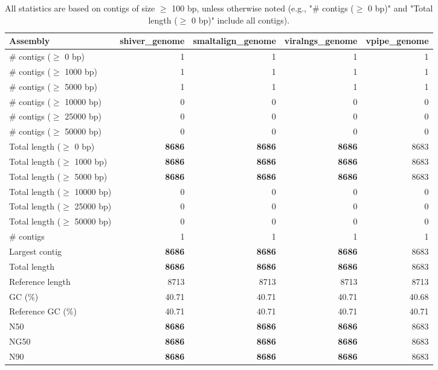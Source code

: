 \documentclass[12pt,a4paper]{article}
\begin{document}
\begin{table}[ht]
\begin{center}
\caption{All statistics are based on contigs of size $\geq$ 100 bp, unless otherwise noted (e.g., "\# contigs ($\geq$ 0 bp)" and "Total length ($\geq$ 0 bp)" include all contigs).}
\begin{tabular}{|l*{4}{|r}|}
\hline
Assembly & shiver\_genome & smaltalign\_genome & viralngs\_genome & vpipe\_genome \\ \hline
\# contigs ($\geq$ 0 bp) & 1 & 1 & 1 & 1 \\ \hline
\# contigs ($\geq$ 1000 bp) & 1 & 1 & 1 & 1 \\ \hline
\# contigs ($\geq$ 5000 bp) & 1 & 1 & 1 & 1 \\ \hline
\# contigs ($\geq$ 10000 bp) & 0 & 0 & 0 & 0 \\ \hline
\# contigs ($\geq$ 25000 bp) & 0 & 0 & 0 & 0 \\ \hline
\# contigs ($\geq$ 50000 bp) & 0 & 0 & 0 & 0 \\ \hline
Total length ($\geq$ 0 bp) & {\bf 8686} & {\bf 8686} & {\bf 8686} & 8683 \\ \hline
Total length ($\geq$ 1000 bp) & {\bf 8686} & {\bf 8686} & {\bf 8686} & 8683 \\ \hline
Total length ($\geq$ 5000 bp) & {\bf 8686} & {\bf 8686} & {\bf 8686} & 8683 \\ \hline
Total length ($\geq$ 10000 bp) & 0 & 0 & 0 & 0 \\ \hline
Total length ($\geq$ 25000 bp) & 0 & 0 & 0 & 0 \\ \hline
Total length ($\geq$ 50000 bp) & 0 & 0 & 0 & 0 \\ \hline
\# contigs & 1 & 1 & 1 & 1 \\ \hline
Largest contig & {\bf 8686} & {\bf 8686} & {\bf 8686} & 8683 \\ \hline
Total length & {\bf 8686} & {\bf 8686} & {\bf 8686} & 8683 \\ \hline
Reference length & 8713 & 8713 & 8713 & 8713 \\ \hline
GC (\%) & 40.71 & 40.71 & 40.71 & 40.68 \\ \hline
Reference GC (\%) & 40.71 & 40.71 & 40.71 & 40.71 \\ \hline
N50 & {\bf 8686} & {\bf 8686} & {\bf 8686} & 8683 \\ \hline
NG50 & {\bf 8686} & {\bf 8686} & {\bf 8686} & 8683 \\ \hline
N90 & {\bf 8686} & {\bf 8686} & {\bf 8686} & 8683 \\ \hline

\end{tabular}
\end{center}
\end{table}
\end{document}
